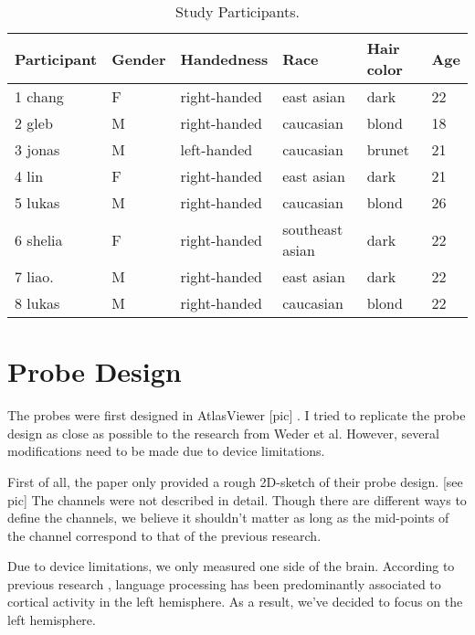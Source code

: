 \documentclass[a4paper, 12pt, twoside]{report}
\begin{document}
\begin{table}[h!]
  \begin{center}
    
    
    \begin{tabular}{p{2.3cm} | p{1.5cm} |p{3cm} | p{3cm} | p{2.5cm} | p{1cm}} %
      \textbf{Participant} & \textbf {Gender}& \textbf{Handedness} & \textbf{Race} & \textbf{Hair color} &\textbf {Age}\\ 
      \hline
      1 chang  & F & right-handed & east asian & dark & 22 \\
      2 gleb    & M & right-handed  & caucasian & blond & 18 \\
      3 jonas  & M & left-handed &  caucasian & brunet & 21\\
      4 lin      & F  & right-handed & east asian & dark& 21 \\
      5 lukas & M & right-handed  &  caucasian& blond & 26 \\
      6 shelia&  F & right-handed & southeast asian & dark & 22 \\
      7 liao.   &  M & right-handed &  east asian & dark & 22 \\
      8 lukas & M & right-handed  & caucasian & blond & 22 \\
    \end{tabular}
    \label{tab:table1}
    \caption{Study Participants.}
  \end{center}
  
\end{table}

\section {Probe Design}
The probes were first designed in AtlasViewer [pic] \cite {10.1117/1.NPh.2.2.020801}. I tried to replicate the probe design as close as possible to the research from Weder et al. However, several modifications need to be made due to device limitations.

First of all, the paper only provided a rough 2D-sketch of their probe design. [see pic] The channels were not described in detail. Though there are different ways to define the channels, we believe it shouldn't matter as long as the mid-points of the channel correspond to that of the previous research.

Due to device limitations, we only measured one side of the brain. According to previous research \cite {Frost1999-vs} , language processing has been predominantly associated to cortical activity in the left hemisphere. As a result, we've decided to focus on the left hemisphere.
\end{document}

